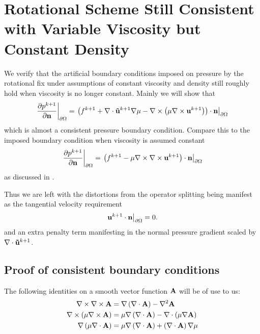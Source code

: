 \documentclass[letterpaper]{erdc}
\begin{document}
\section{Rotational Scheme Still Consistent with Variable Viscosity but Constant Density}
We verify that the artificial boundary conditions imposed on pressure by the rotational fix under assumptions of constant viscosity and density still roughly hold when viscosity is no longer constant.  Mainly we will show that 
\begin{equation}
  \left.\frac{\partial p^{k+1}}{\partial \textbf{n}}\right|_{\partial\Omega} = \left.\left(f^{k+1} + \nabla\cdot\mathbf{\tilde{u}}^{k+1}\nabla\mu - \nabla\times\left(\mu\nabla\times \textbf{u}^{k+1}  \right)  \right)\cdot \textbf{n}\right|_{\partial\Omega}
\end{equation}
which is almost a consistent pressure boundary condition.  Compare this to the imposed boundary condition when viscosity is assumed constant
\begin{equation}
  \left.\frac{\partial p^{k+1}}{\partial \textbf{n}}\right|_{\partial\Omega} = \left.\left(f^{k+1} - \mu\nabla\times\nabla\times \textbf{u}^{k+1} \right)\cdot \textbf{n}\right|_{\partial\Omega}
\end{equation}
 as discussed in \cite{guermond2004error}.  
 
 Thus we are left with the distortions from the operator splitting being manifest as the tangential velocity requirement
\begin{equation}
  \left.\textbf{u}^{k+1}\cdot\textbf{n}\right|_{\partial\Omega} = 0.
\end{equation}
and an extra penalty term manifesting in the normal pressure gradient scaled by $\nabla\cdot\mathbf{\tilde{u}}^{k+1}$.  



%
%
\subsection{Proof of consistent boundary conditions}
The following identities on a smooth vector function $\mathbf{A}$ will be of use to us:
\begin{align}
  \nabla\times\nabla\times \mathbf{A} &= \nabla\left( \nabla\cdot \mathbf{A}\right) - \nabla^2 \mathbf{A}\label{eqn:curlcurlidentity}\\
  \nabla\times\left( \mu \nabla\times \mathbf{A} \right) &= \mu\nabla\left(\nabla\cdot \mathbf{A}\right) - \nabla\cdot\left(\mu \nabla \mathbf{A} \right)\label{eqn:curlmucurlidentity}\\
  \nabla\left( \mu \nabla\cdot \mathbf{A}\right) &= \mu\nabla\left(\nabla\cdot \mathbf{A}\right) + \left( \nabla\cdot \mathbf{A}\right)\nabla\mu\label{eqn:gradmudividentity}
\end{align}
\end{document}
